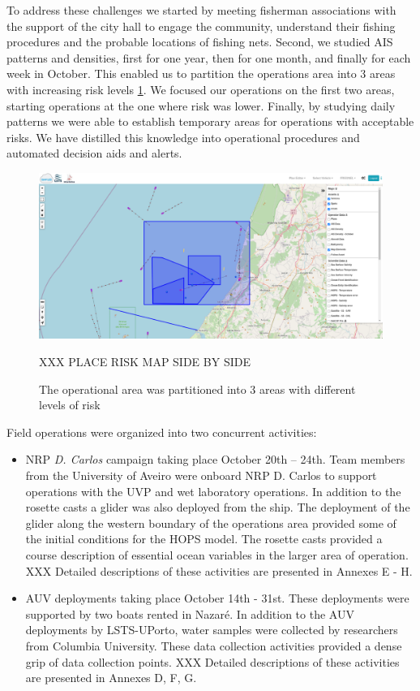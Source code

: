 To address these challenges we started by meeting fisherman associations
with the support of the city hall to engage the community, understand
their fishing procedures and the probable locations of fishing nets.
Second, we studied AIS patterns and densities, first for one year, then
for one month, and finally for each week in October. This enabled us to
partition the operations area into 3 areas with increasing risk levels
\ref{fig:riskareas}. We focused our operations on the first two areas,
starting operations at the one where risk was lower. Finally, by
studying daily patterns we were able to establish temporary areas for
operations with acceptable risks. We have distilled this knowledge into
operational procedures and automated decision aids and alerts.

\begin{figure}
    \centering
    \includegraphics[width=.7\linewidth]{fig/riskareas.png}
    \caption{The operational area was partitioned into 3 areas with
      different levels of risk} XXX PLACE RISK MAP SIDE BY SIDE
    \label{fig:riskareas}
\end{figure}

Field operations were organized into two concurrent activities:

\begin{itemize}
\item NRP \emph{D. Carlos} campaign taking place October 20th – 24th.
  Team members from the University of Aveiro were onboard NRP D. Carlos
  to support operations with the UVP and wet laboratory operations. In
  addition to the rosette casts a glider was also deployed from the
  ship. The deployment of the glider along the western boundary of the
  operations area provided some of the initial conditions for the HOPS
  model. The rosette casts provided a course description of essential
  ocean variables in the larger area of operation. XXX Detailed
  descriptions of these activities are presented in Annexes E - H.

\item AUV deployments taking place October 14th - 31st. These
  deployments were supported by two boats rented in Nazaré. In addition
  to the AUV deployments by LSTS-UPorto, water samples were collected by
  researchers from Columbia University. These data collection activities
  provided a dense grip of data collection points. XXX Detailed
  descriptions of these activities are presented in Annexes D, F, G.

\end{itemize}

